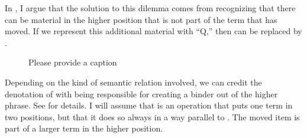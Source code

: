 \documentclass[output=paper]{langsci/langscibook}
\begin{document}
In \cite{Johnson2012}, I argue that the solution to this dilemma comes from
recognizing that there can be material in the higher position that is not part
of the term that has moved. If we represent this additional material with
``Q,'' then  can be replaced by .

\begin{figure}
    \caption{\color{red}Please provide a caption\label{ex:multi2}}
\end{figure}
%

Depending on the kind of semantic relation involved, we can credit the
denotation of  with being responsible for creating a binder out of the
higher phrase. See \cite{Johnson2012} for details. I will assume that 
is an operation that puts one term in two positions, but that it does so always
in a way parallel to . The moved item is part of a larger term
in the higher position.
\end{document}
